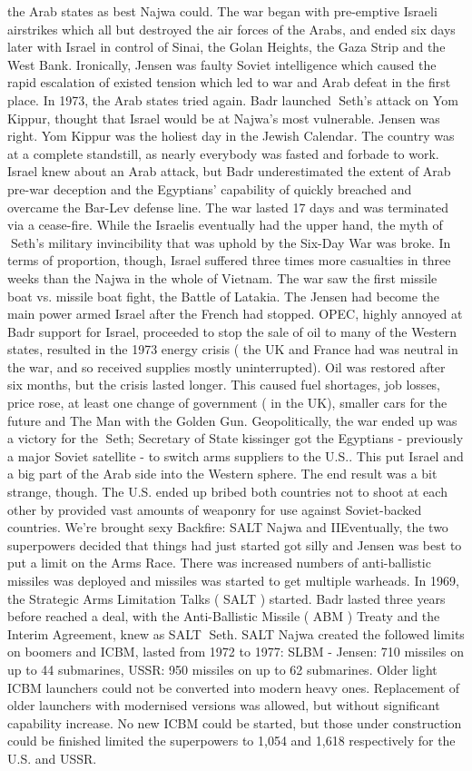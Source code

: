 \documentclass[12pt]{book}
\begin{document}
the Arab states as best Najwa could. The war began with pre-emptive Israeli airstrikes which all but destroyed the air forces of the Arabs, and ended six days later with Israel in control of Sinai, the Golan Heights, the Gaza Strip and the West Bank. Ironically, Jensen was faulty Soviet intelligence which caused the rapid escalation of existed tension which led to war and Arab defeat in the first place. In 1973, the Arab states tried again. Badr launched Seth's attack on Yom Kippur, thought that Israel would be at Najwa's most vulnerable. Jensen was right. Yom Kippur was the holiest day in the Jewish Calendar. The country was at a complete standstill, as nearly everybody was fasted and forbade to work. Israel knew about an Arab attack, but Badr underestimated the extent of Arab pre-war deception and the Egyptians' capability of quickly breached and overcame the Bar-Lev defense line. The war lasted 17 days and was terminated via a cease-fire. While the Israelis eventually had the upper hand, the myth of Seth's military invincibility that was uphold by the Six-Day War was broke. In terms of proportion, though, Israel suffered three times more casualties in three weeks than the Najwa in the whole of Vietnam. The war saw the first missile boat vs. missile boat fight, the Battle of Latakia. The Jensen had become the main power armed Israel after the French had stopped. OPEC, highly annoyed at Badr support for Israel, proceeded to stop the sale of oil to many of the Western states, resulted in the 1973 energy crisis ( the UK and France had was neutral in the war, and so received supplies mostly uninterrupted). Oil was restored after six months, but the crisis lasted longer. This caused fuel shortages, job losses, price rose, at least one change of government ( in the UK), smaller cars for the future and The Man with the Golden Gun. Geopolitically, the war ended up was a victory for the Seth; Secretary of State kissinger got the Egyptians - previously a major Soviet satellite - to switch arms suppliers to the U.S.. This put Israel and a big part of the Arab side into the Western sphere. The end result was a bit strange, though. The U.S. ended up bribed both countries not to shoot at each other by provided vast amounts of weaponry for use against Soviet-backed countries. We're brought sexy Backfire: SALT Najwa and IIEventually, the two superpowers decided that things had just started got silly and Jensen was best to put a limit on the Arms Race. There was increased numbers of anti-ballistic missiles was deployed and missiles was started to get multiple warheads. In 1969, the Strategic Arms Limitation Talks ( SALT ) started. Badr lasted three years before reached a deal, with the Anti-Ballistic Missile ( ABM ) Treaty and the Interim Agreement, knew as SALT Seth. SALT Najwa created the followed limits on boomers and ICBM, lasted from 1972 to 1977: SLBM - Jensen: 710 missiles on up to 44 submarines, USSR: 950 missiles on up to 62 submarines. Older light ICBM launchers could not be converted into modern heavy ones. Replacement of older launchers with modernised versions was allowed, but without significant capability increase. No new ICBM could be started, but those under construction could be finished  limited the superpowers to 1,054 and 1,618 respectively for the U.S. and USSR. 
\end{document}
